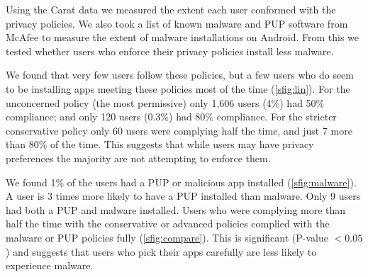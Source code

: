 \documentclass[a4paper]{scrartcl}
\begin{document}
Using the Carat data we measured the extent each user conformed with the privacy policies.
We also took a list of known malware and \ac{PUP} software from McAfee to measure the extent of malware installations on Android.
From this we tested whether users who enforce their privacy policies install less malware.

We found that very few users follow these policies, but a few users who do seem to be installing apps meeting these policies most of the time (\autoref{sfig:lin}).
For the unconcerned policy (the most permissive) only 1,606 users (4\%) had 50\% compliance;
and only 120 users (0.3\%) had 80\% compliance.
For the stricter conservative policy only 60 users were complying half the time, and just 7 more than 80\% of the time.
This suggests that while users may have privacy preferences the majority are not attempting to enforce them.

We found 1\% of the users had a PUP or malicious app installed (\autoref{sfig:malware}).
A user is 3 times more likely to have a PUP installed than malware.
Only 9 users had both a PUP and malware installed.
Users who were complying more than half the time with the conservative or advanced policies complied with the malware or PUP policies fully (\autoref{sfig:compare}).
This is significant (P-value $< 0.05$) and suggests that users who pick their apps carefully are less likely to experience malware.
\end{document}
